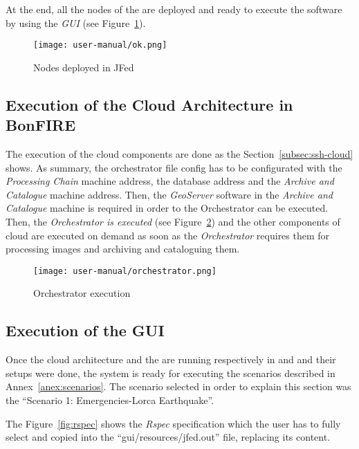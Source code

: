 At the end, all the nodes of the \sss are deployed and ready to execute the
software by using the \emph{GUI} (see Figure~\ref{fig:deployed-jfed}).

\begin{figure}[!h]
\begin{center}
\texttt{[image: user-manual/ok.png]}
\caption{Nodes deployed in JFed}
\label{fig:deployed-jfed}
\end{center}
\end{figure}


\subsection{Execution of the Cloud Architecture in BonFIRE}

The execution of the cloud components are done as the
Section~\ref{subsec:ssh-cloud} shows. 
As summary, the orchestrator file config has to be configurated with the
\emph{Processing Chain} machine address, the database address and the \emph{Archive and Catalogue}
machine address. Then, the \emph{GeoServer} software in the \emph{Archive and
  Catalogue} machine is required in order to the Orchestrator can be
executed. Then, the \emph{Orchestrator is executed} (see Figure~\ref{fig:orch-execution}) and the
other components of cloud are executed on demand as soon as the
\emph{Orchestrator} requires them for processing images and archiving and
cataloguing them.

\begin{figure}[!h]
\begin{center}
\texttt{[image: user-manual/orchestrator.png]}
\caption{Orchestrator execution}
\label{fig:orch-execution}
\end{center}
\end{figure}


\subsection{Execution of the GUI}

Once the cloud architecture  and the \sss are running respectively in \bonfire
and \vw and their setups were done, the system is ready for executing the
scenarios described in Annex~\ref{anex:scenarios}. The scenario selected in order to explain this
section was  the ``Scenario 1: Emergencies-Lorca Earthquake''.


The Figure~\ref{fig:rspec} shows the \emph{Rspec} specification which the user
has to fully select and copied into the ``gui/resources/jfed.out'' file,
replacing its content.

